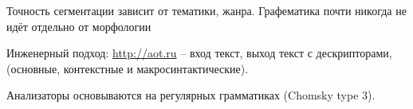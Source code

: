 \documentclass[a4paper]{article}
\newcommand{\eng}[1]{\foreignlanguage{english}{#1}}
\begin{document}
Точность сегментации зависит от тематики, жанра.
Графематика почти никогда не идёт отдельно от морфологии

Инженерный подход: \url{http://aot.ru} -- вход текст, выход текст с дескрипторами, (основные, контекстные и макросинтактические).


Анализаторы основываются на регулярных грамматиках (\eng{Chomsky type 3}).

\end{document}
